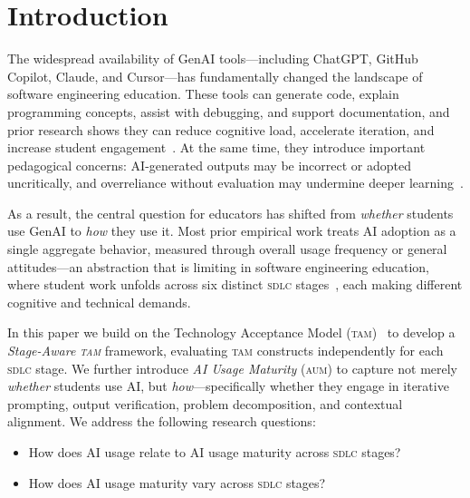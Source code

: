\documentclass[sigconf,anonymous]{acmart}
\newcommand{\AUM}{\textsc{aum}\xspace}
\newcommand{\TAM}{\textsc{tam}\xspace}
\newcommand{\SDLC}{\textsc{sdlc}\xspace}
\newcommand{\GenAI}{GenAI\xspace}
\begin{document}
\maketitle

\section{Introduction}
\label{sec:intro}

The widespread availability of \GenAI tools---including ChatGPT, GitHub
Copilot, Claude, and Cursor---has fundamentally changed the landscape of
software engineering education. These tools can generate code, explain
programming concepts, assist with debugging, and support documentation,
and prior research shows they can reduce cognitive load, accelerate
iteration, and increase student engagement~\cite{becker2023,
kazemitabaar2023, ali2025}. At the same time, they introduce important
pedagogical concerns: AI-generated outputs may be incorrect or adopted
uncritically, and overreliance without evaluation may undermine deeper
learning~\cite{pirzado2024, sakib2023}.

As a result, the central question for educators has shifted from
\emph{whether} students use \GenAI to \emph{how} they use it.
Most prior empirical work treats AI adoption as a single aggregate
behavior, measured through overall usage frequency or general
attitudes---an abstraction that is limiting in software engineering
education, where student work unfolds across six distinct \SDLC
stages~\cite{russo2024}, each making different cognitive and technical
demands.

In this paper we build on the Technology Acceptance Model
(\TAM)~\cite{davis1989a, davis1989b} to develop a \emph{Stage-Aware
\TAM} framework, evaluating \TAM constructs independently for each \SDLC
stage. We further introduce \emph{AI Usage Maturity} (\AUM) to capture
not merely \emph{whether} students use AI, but \emph{how}---specifically
whether they engage in iterative prompting, output verification, problem
decomposition, and contextual alignment. We address the following research
questions:

\begin{itemize}[noitemsep,topsep=2pt]
  \item[\textbf{RQ1}] How does AI usage relate to AI usage maturity across \SDLC stages?
  \item[\textbf{RQ2}] How does AI usage maturity vary across \SDLC stages?
\end{itemize}
\end{document}
